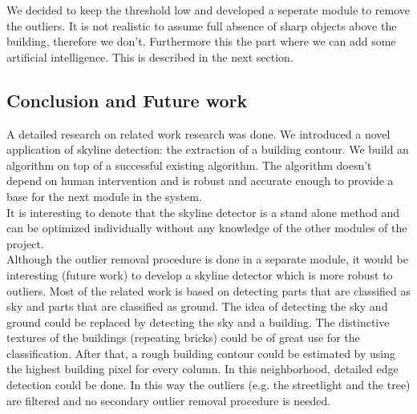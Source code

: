 We decided to keep the threshold low and developed a seperate module to remove the outliers. It is not realistic to
assume full absence of sharp objects above the building, therefore we don't.
Furthermore this the part where we can add some artificial intelligence. This is
described in the next section.  



\subsection{Conclusion and Future work}
A detailed research on related work research was done.
We introduced a novel application of skyline detection: the extraction of a
building contour. We build an algorithm on top of a successful existing
algorithm.  The algorithm doesn't depend on human intervention and is robust and
accurate enough to provide a base for the next module in the system.\\
It is interesting to denote that the skyline detector is a stand alone method and
can be optimized individually without any knowledge of the other modules of the
project.\\

Although the outlier removal procedure is done in a separate module, it would be
interesting (future work) to develop a skyline detector which is more robust to
outliers.  Most of the related work is based on detecting parts that are
classified as sky and parts that are classified as ground. The idea of detecting
the sky and ground could be replaced by detecting the sky and a building. The
distinctive textures of the buildings (repeating bricks) could be of great use
for the classification.  After that, a rough building contour could be estimated
	by using the highest building pixel for every column. In this neighborhood,
	detailed edge detection could be done. In this way the outliers (e.g. the
	streetlight and the tree) are filtered and no secondary outlier removal
	procedure is needed.





